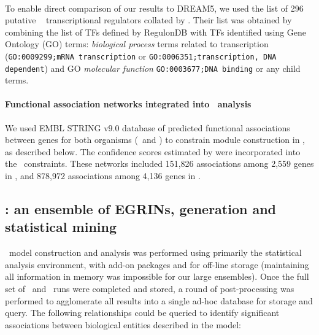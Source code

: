 \paragraph{\eco}
\label{section:eco_tfs}

To enable direct comparison of our results to DREAM5, we used the list of 296 putative \eco~ transcriptional regulators collated by \cite{marbach_wisdom_2012}. Their list was obtained by combining the list of TFs defined by RegulonDB \cite{gama-castro_regulondb_2011} with TFs identified using Gene Ontology (GO) terms: \textit{biological process} terms related to transcription (\texttt{GO:0009299;mRNA transcription} or \texttt{GO:0006351;transcription, DNA dependent}) and GO \textit{molecular function} \texttt{GO:0003677;DNA binding} or any child terms.

\paragraph{Functional association networks integrated into \cm~analysis}

We used EMBL STRING \cite{szklarczyk_string_2011} v9.0 database of predicted functional associations between genes for both organisms (\halo~and \eco) to constrain module construction in \cm, as described below. The confidence scores estimated by \cite{szklarczyk_string_2011} were incorporated into the \cm~constraints. These networks included 151,826 associations among 2,559 genes in \halo, and 878,972 associations among 4,136 genes in \eco.

\subsection{\egrine: an ensemble of EGRINs, generation and statistical mining}

\egrine~model construction and analysis was performed using primarily the  statistical analysis environment, with add-on packages  and  for off-line storage (maintaining all information in memory was impossible for our large ensembles). Once the full set of \cm\ and \nwinf\ runs were completed and stored, a round of post-processing was performed to agglomerate all results into a single ad-hoc database for storage and query. The following relationships could be queried to identify significant associations between biological entities described in the model:\\

